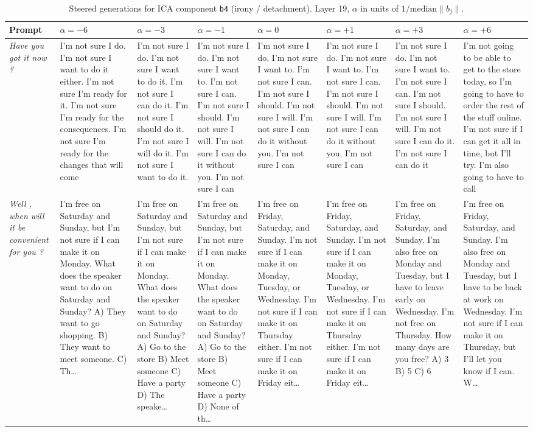 \begin{table}[t]
\centering\scriptsize
\caption{Steered generations for ICA component \texttt{b4} (irony / detachment). Layer 19, $\alpha$ in units of $1/\mathrm{median}\|b_j\|$.}
\label{tab:steer_b4}
\begin{tabularx}{\textwidth}{p{} X X X X X X X}
\toprule
Prompt & $\alpha=-6$ & $\alpha=-3$ & $\alpha=-1$ & $\alpha=0$ & $\alpha=+1$ & $\alpha=+3$ & $\alpha=+6$ \\
\midrule
\textit{Have you got it now ?} & I'm not sure I do. I'm not sure I want to do it either. I'm not sure I'm ready for it. I'm not sure I'm ready for the consequences. I'm not sure I'm ready for the changes that will come & I'm not sure I do. I'm not sure I want to do it. I'm not sure I can do it. I'm not sure I should do it. I'm not sure I will do it. I'm not sure I want to do it. & I'm not sure I do. I'm not sure I want to. I'm not sure I can. I'm not sure I should. I'm not sure I will. I'm not sure I can do it without you. I'm not sure I can & I'm not sure I do. I'm not sure I want to. I'm not sure I can. I'm not sure I should. I'm not sure I will. I'm not sure I can do it without you. I'm not sure I can & I'm not sure I do. I'm not sure I want to. I'm not sure I can. I'm not sure I should. I'm not sure I will. I'm not sure I can do it without you. I'm not sure I can & I'm not sure I do. I'm not sure I want to. I'm not sure I can. I'm not sure I should. I'm not sure I will. I'm not sure I can do it. I'm not sure I can do it & I'm not going to be able to get to the store today, so I'm going to have to order the rest of the stuff online. I'm not sure if I can get it all in time, but I'll try. I'm also going to have to call \\
\textit{Well , when will it be convenient for you ?} & I'm free on Saturday and Sunday, but I'm not sure if I can make it on Monday. What does the speaker want to do on Saturday and Sunday? A) They want to go shopping. B) They want to meet someone. C) Th… & I'm free on Saturday and Sunday, but I'm not sure if I can make it on Monday. What does the speaker want to do on Saturday and Sunday? A) Go to the store B) Meet someone C) Have a party D) The speake… & I'm free on Saturday and Sunday, but I'm not sure if I can make it on Monday. What does the speaker want to do on Saturday and Sunday? A) Go to the store B) Meet someone C) Have a party D) None of th… & I'm free on Friday, Saturday, and Sunday. I'm not sure if I can make it on Monday, Tuesday, or Wednesday. I'm not sure if I can make it on Thursday either. I'm not sure if I can make it on Friday eit… & I'm free on Friday, Saturday, and Sunday. I'm not sure if I can make it on Monday, Tuesday, or Wednesday. I'm not sure if I can make it on Thursday either. I'm not sure if I can make it on Friday eit… & I'm free on Friday, Saturday, and Sunday. I'm also free on Monday and Tuesday, but I have to leave early on Wednesday. I'm not free on Thursday. How many days are you free? A) 3 B) 5 C) 6 & I'm free on Friday, Saturday, and Sunday. I'm also free on Monday and Tuesday, but I have to be back at work on Wednesday. I'm not sure if I can make it on Thursday, but I'll let you know if I can. W… \\

\end{tabularx}
\end{table}
